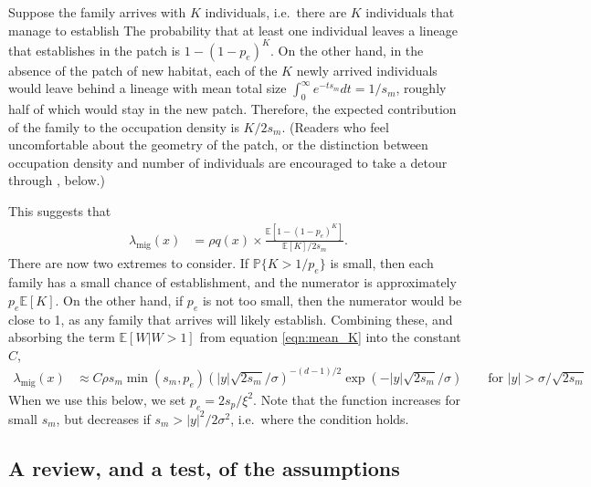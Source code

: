 \documentclass{article}
\renewcommand{\P}{\mathbb{P}}
\newcommand{\E}{\mathbb{E}}
\newcommand{\migrate}{\lambda_\text{mig}}
\begin{document}
Suppose the family arrives with $K$ individuals,
i.e.\ there are $K$ individuals that manage to establish
The probability that at least one individual leaves a lineage that establishes in the patch
is $1-(1-p_e)^K$.
On the other hand, in the absence of the patch of new habitat,
each of the $K$ newly arrived individuals would leave behind a lineage with 
mean total size $\int_0^\infty e^{-t s_m} dt = 1/s_m$,
roughly half of which would stay in the new patch.
Therefore, the expected contribution of the family to the occupation density is $K/2s_m$.
(Readers who feel uncomfortable about the geometry of the patch,
or the distinction between occupation density and number of individuals
are encouraged to take a detour through , below.)

This suggests that 
\begin{align} \label{eqn:ratio_K}
  \migrate(x) 
    &= \rho q(x) \times 
    \frac{
        \E[1-(1-p_e)^K]
    }{
        \E[K]/2s_m
    } .
\end{align}
There are now two extremes to consider.
If $\P\{K>1/p_e\}$ is small, then each family has a small chance of establishment,
and the numerator is approximately $p_e \E[K]$.
On the other hand, if $p_e$ is not too small,
then the numerator would be close to 1, as any family that arrives will likely establish.
Combining these, and absorbing the term $\E[W|W>1]$ from equation \eqref{eqn:mean_K} 
into the constant $C$,
\begin{align} \label{eqn:migrate}
  \migrate(x) &\approx C \rho s_m \min(s_m,p_e) \left( |y| \sqrt{2 s_m}/\sigma \right)^{-(d-1)/2} \exp( - |y| \sqrt{2 s_m} / \sigma)  \qquad \text{for } |y| > \sigma/\sqrt{2 s_m} 
\end{align}
When we use this below, we set $p_e = 2 s_p / \xi^2$.
Note that the function increases for small $s_m$, 
but decreases if $s_m > |y|^2 / 2 \sigma^2$, 
i.e.\ where the condition holds.


\subsection{A review, and a test, of the assumptions}
\label{ss:assumptions}
\end{document}
